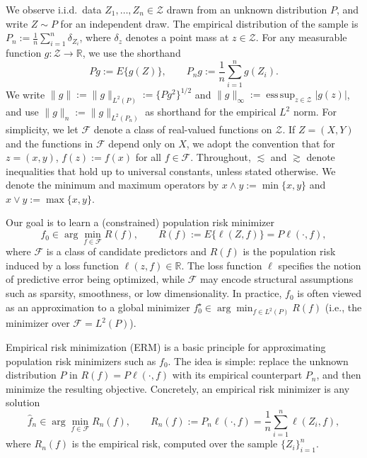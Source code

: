 \documentclass[11pt]{article}
\theoremstyle{plain}
\theoremstyle{definition} %
\DeclareMathOperator*{\esssup}{ess\,sup}
\begin{document}
We observe i.i.d.\ data \(Z_1,\ldots,Z_n\in\mathcal Z\) drawn from an unknown
distribution \(P\), and write \(Z\sim P\) for an independent draw. The empirical
distribution of the sample is \(P_n := \frac{1}{n}\sum_{i=1}^n \delta_{Z_i}\),
where \(\delta_z\) denotes a point mass at \(z\in\mathcal Z\). For any measurable
function \(g:\mathcal Z\to\mathbb R\), we use the shorthand
\[
Pg := E\{g(Z)\},
\qquad
P_n g := \frac{1}{n}\sum_{i=1}^n g(Z_i).
\]
We write \(\|g\|:=\|g\|_{L^2(P)}:=\{Pg^2\}^{1/2}\) and
\(\|g\|_\infty:=\esssup_{z\in\mathcal Z}|g(z)|\), and use
\(\|g\|_n:=\|g\|_{L^2(P_n)}\) as shorthand for the empirical \(L^2\) norm. For simplicity, we let
\(\mathcal F\) denote a class of real-valued functions on \(\mathcal Z\). If
\(Z=(X,Y)\) and the functions in \(\mathcal F\) depend only on \(X\), we adopt
the convention that for \(z=(x,y)\), \(f(z):=f(x)\) for all \(f\in\mathcal F\). Throughout, \(\lesssim\) and \(\gtrsim\) denote inequalities that hold up to
universal constants, unless stated otherwise. We denote the minimum and maximum operators by
\(x \wedge y := \min\{x,y\}\) and \(x \vee y := \max\{x,y\}\).



Our goal is to learn a (constrained) population risk minimizer
\[
f_0 \in \arg\min_{f\in\mathcal{F}} R(f), \qquad
R(f) := E\{\ell(Z,f)\} = P \ell(\cdot,f),
\]
where \(\mathcal{F}\) is a class of candidate predictors and \(R(f)\) is the population risk induced by a loss function \(\ell(z,f)\in\mathbb{R}\). The loss function \(\ell\) specifies the notion of predictive error being optimized, while \(\mathcal{F}\) may encode structural assumptions such as sparsity, smoothness, or low dimensionality. In practice, \(f_0\) is often viewed as an approximation to a global minimizer
\(f_0^\star \in \arg\min_{f\in L^2(P)} R(f)\) (i.e., the minimizer over \(\mathcal{F}=L^2(P)\)).



Empirical risk minimization (ERM) is a basic principle for approximating population risk minimizers such as \(f_0\). The idea is simple: replace the unknown distribution \(P\) in \(R(f)=P\ell(\cdot,f)\) with its empirical counterpart \(P_n\), and then minimize the resulting objective. Concretely, an empirical risk minimizer is any solution
\[
\hat f_n \in \arg\min_{f\in\mathcal F} R_n(f), \qquad
R_n(f) := P_n\ell(\cdot,f)=\frac{1}{n}\sum_{i=1}^n \ell(Z_i,f),
\]
where \(R_n(f)\) is the empirical risk, computed over the sample $\{Z_i\}_{i=1}^n$.

 
\end{document}
